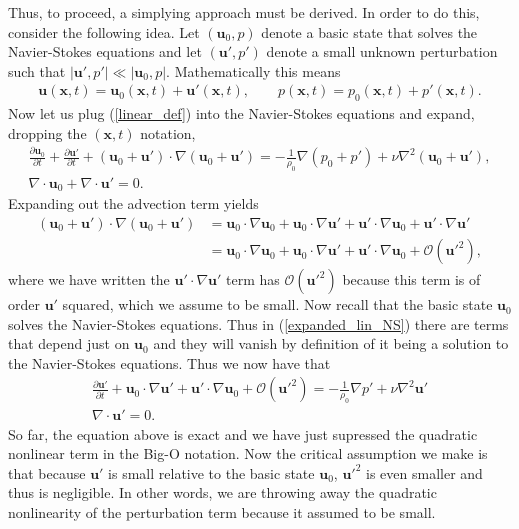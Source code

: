 Thus, to proceed, a simplying approach must be derived. In order to do this, consider the following idea. Let $(\bm{u}_{0},p)$ denote a basic state that solves the Navier-Stokes equations and let $(\bm{u}',p')$ denote a small unknown perturbation such that $|\bm{u}',p'|\ll |\bm{u}_{0},p|$. Mathematically this means
\begin{align}
\bm{u}(\bm{x},t) = \bm{u}_{0}(\bm{x},t) + \bm{u}'(\bm{x},t),\qquad\label{linear_def} p(\bm{x},t) = p_{0}(\bm{x},t) + p'(\bm{x},t).
\end{align}
Now let us plug (\ref{linear_def}) into the Navier-Stokes equations and expand, dropping the $(\bm{x},t)$ notation,
\begin{align}
\frac{\partial \bm{u}_{0}}{\partial t} + \frac{\partial \bm{u}'}{\partial t} + (\bm{u}_{0}+\bm{u}')\cdot\nabla(\bm{u}_{0}+\bm{u}') = -\frac{1}{\rho_{0}}\nabla(p_{0} + p') + \nu\nabla^{2}(\bm{u}_{0} + \bm{u}'),\\\label{expanded_lin_NS}
\nabla \cdot \bm{u}_{0} + \nabla \cdot \bm{u}'=0.
\end{align} Expanding out the advection term yields
\begin{align}
 (\bm{u}_{0}+\bm{u}')\cdot\nabla(\bm{u}_{0}+\bm{u}') &= \bm{u}_{0}\cdot\nabla\bm{u}_{0} + \bm{u}_{0}\cdot\nabla \bm{u}' + \bm{u}'\cdot\nabla\bm{u}_{0} + \bm{u}'\cdot\nabla\bm{u}'\\
&= \bm{u}_{0}\cdot\nabla\bm{u}_{0} + \bm{u}_{0}\cdot\nabla \bm{u}' + \bm{u}'\cdot\nabla\bm{u}_{0} + \mathcal{O}(\bm{u}'^{2}),
\end{align}
where we have written the $\bm{u}'\cdot\nabla\bm{u}'$ term has $\mathcal{O}(\bm{u}'^{2})$ because this term is of order $\bm{u}'$ squared, which we assume to be small. Now recall that the basic state $\bm{u}_{0}$ solves the Navier-Stokes equations. Thus in (\ref{expanded_lin_NS}) there are terms that depend just on $\bm{u}_{0}$ and they will vanish by definition of it being a solution to the Navier-Stokes equations. Thus we now have that
\begin{align}
\frac{\partial \bm{u}'}{\partial t} + \bm{u}_{0}\cdot\nabla \bm{u}' + \bm{u}'\cdot\nabla\bm{u}_{0} + \mathcal{O}(\bm{u}'^{2})  = -\frac{1}{\rho_{0}}\nabla p' + \nu\nabla^{2}\bm{u}'\\
 \nabla \cdot \bm{u}'=0.
\end{align}
So far, the equation above is exact and we have just supressed the quadratic nonlinear term in the Big-O notation. Now the critical assumption we make is that because $\bm{u}'$ is small relative to the basic state $\bm{u}_{0}$, $\bm{u}'^{2}$ is even smaller and thus is negligible. In other words, we are throwing away the quadratic nonlinearity of the perturbation term because it assumed to be small. 


